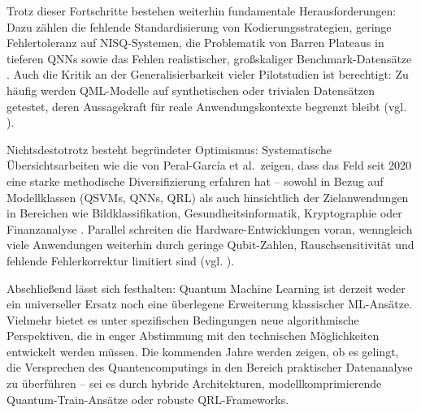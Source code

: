 Trotz dieser Fortschritte bestehen weiterhin fundamentale Herausforderungen: Dazu zählen die fehlende Standardisierung von Kodierungsstrategien, geringe Fehlertoleranz auf NISQ-Systemen, die Problematik von Barren Plateaus in tieferen QNNs sowie das Fehlen realistischer, großskaliger Benchmark-Datensätze . Auch die Kritik an der Generalisierbarkeit vieler Pilotstudien ist berechtigt: Zu häufig werden QML-Modelle auf synthetischen oder trivialen Datensätzen getestet, deren Aussagekraft für reale Anwendungskontexte begrenzt bleibt (vgl. \cite{bowlesBetterClassicalSubtle2024a, peral-garciaSystematicLiteratureReview2024}).

Nichtsdestotrotz besteht begründeter Optimismus: Systematische Übersichtsarbeiten wie die von Peral-García et al.\ zeigen, dass das Feld seit 2020 eine starke methodische Diversifizierung erfahren hat – sowohl in Bezug auf Modellklassen (QSVMs, QNNs, QRL) als auch hinsichtlich der Zielanwendungen in Bereichen wie Bildklassifikation, Gesundheitsinformatik, Kryptographie oder Finanzanalyse . Parallel schreiten die Hardware-Entwicklungen voran, wenngleich viele Anwendungen weiterhin durch geringe Qubit-Zahlen, Rauschsensitivität und fehlende Fehlerkorrektur limitiert sind (vgl. \cite{peral-garciaSystematicLiteratureReview2024}).

Abschließend lässt sich festhalten: Quantum Machine Learning ist derzeit weder ein universeller Ersatz noch eine überlegene Erweiterung klassischer ML-Ansätze. Vielmehr bietet es unter spezifischen Bedingungen neue algorithmische Perspektiven, die in enger Abstimmung mit den technischen Möglichkeiten entwickelt werden müssen. Die kommenden Jahre werden zeigen, ob es gelingt, die Versprechen des Quantencomputings in den Bereich praktischer Datenanalyse zu überführen – sei es durch hybride Architekturen, modellkomprimierende Quantum-Train-Ansätze oder robuste QRL-Frameworks.

\printbibliography
